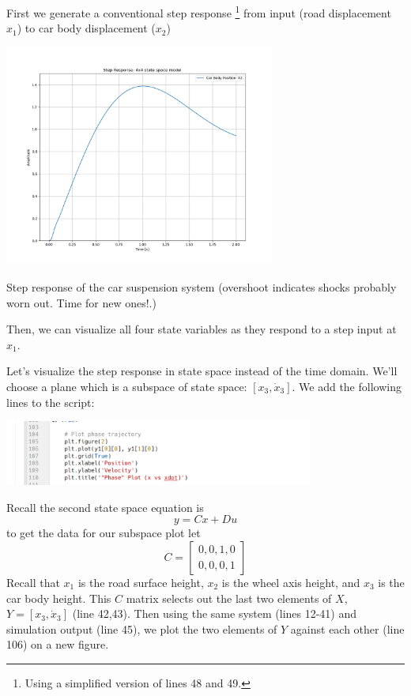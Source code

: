 \begin{ExampleCont}
First we generate a conventional step response
\footnote{Using a simplified version of lines
48 and 49.}
from input (road displacement $x_1$) to car body
displacement ($x_2$)

\begin{center}
    \includegraphics[width=3.5in]{figs08/singleCarBodyStep.png}

    {Step response of the car suspension system (overshoot indicates shocks probably
        worn out. Time for new ones!.)}\label{graphsuspensionstep}
\end{center}

Then, we can visualize all four state variables as they respond to a step input at $x_1$.

Let's visualize the step response in state space instead of the time domain.   We'll choose
a plane which is a subspace of state space: $[x_3, \dot{x}_3]$.   We add the following lines
to the script:

\begin{center}
    \includegraphics[width=4in]{figs08/ss_phase_addon.png}
\end{center}

Recall the second state space equation is
\[
y=Cx+Du
\]
to get the data for our subspace plot let
\[
C = \begin{bmatrix} 0,0,1,0 \\ 0,0,0,1 \end{bmatrix}
\]
Recall that $x_1$ is the road surface height, $x_2$ is the wheel axis height, and $x_3$ is the car body height.
This $C$ matrix selects out the last two elements of $X$, $Y=[x_3, \dot{x}_3]$ (line 42,43).  Then using
the same system (lines 12-41) and simulation output (line 45),
we plot the two elements of $Y$ against each other (line 106) on a new figure.
\end{ExampleCont}


